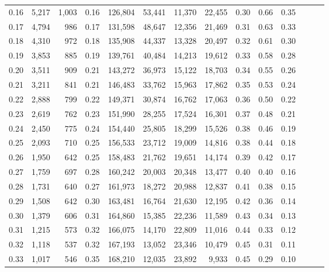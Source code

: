 \begin{tabular}{rrrrrrrrrrrrrr}
0.16 &   5,217 &  1,003 &  0.16 &  126,804 &   53,441 &  11,370 &  22,455 &  0.30 &  0.66 &      0.35 \\
0.17 &   4,794 &    986 &  0.17 &  131,598 &   48,647 &  12,356 &  21,469 &  0.31 &  0.63 &      0.33 \\
0.18 &   4,310 &    972 &  0.18 &  135,908 &   44,337 &  13,328 &  20,497 &  0.32 &  0.61 &      0.30 \\
0.19 &   3,853 &    885 &  0.19 &  139,761 &   40,484 &  14,213 &  19,612 &  0.33 &  0.58 &      0.28 \\
0.20 &   3,511 &    909 &  0.21 &  143,272 &   36,973 &  15,122 &  18,703 &  0.34 &  0.55 &      0.26 \\
0.21 &   3,211 &    841 &  0.21 &  146,483 &   33,762 &  15,963 &  17,862 &  0.35 &  0.53 &      0.24 \\
0.22 &   2,888 &    799 &  0.22 &  149,371 &   30,874 &  16,762 &  17,063 &  0.36 &  0.50 &      0.22 \\
0.23 &   2,619 &    762 &  0.23 &  151,990 &   28,255 &  17,524 &  16,301 &  0.37 &  0.48 &      0.21 \\
0.24 &   2,450 &    775 &  0.24 &  154,440 &   25,805 &  18,299 &  15,526 &  0.38 &  0.46 &      0.19 \\
0.25 &   2,093 &    710 &  0.25 &  156,533 &   23,712 &  19,009 &  14,816 &  0.38 &  0.44 &      0.18 \\
0.26 &   1,950 &    642 &  0.25 &  158,483 &   21,762 &  19,651 &  14,174 &  0.39 &  0.42 &      0.17 \\
0.27 &   1,759 &    697 &  0.28 &  160,242 &   20,003 &  20,348 &  13,477 &  0.40 &  0.40 &      0.16 \\
0.28 &   1,731 &    640 &  0.27 &  161,973 &   18,272 &  20,988 &  12,837 &  0.41 &  0.38 &      0.15 \\
0.29 &   1,508 &    642 &  0.30 &  163,481 &   16,764 &  21,630 &  12,195 &  0.42 &  0.36 &      0.14 \\
0.30 &   1,379 &    606 &  0.31 &  164,860 &   15,385 &  22,236 &  11,589 &  0.43 &  0.34 &      0.13 \\
0.31 &   1,215 &    573 &  0.32 &  166,075 &   14,170 &  22,809 &  11,016 &  0.44 &  0.33 &      0.12 \\
0.32 &   1,118 &    537 &  0.32 &  167,193 &   13,052 &  23,346 &  10,479 &  0.45 &  0.31 &      0.11 \\
0.33 &   1,017 &    546 &  0.35 &  168,210 &   12,035 &  23,892 &   9,933 &  0.45 &  0.29 &      0.10 \\

\end{tabular}

